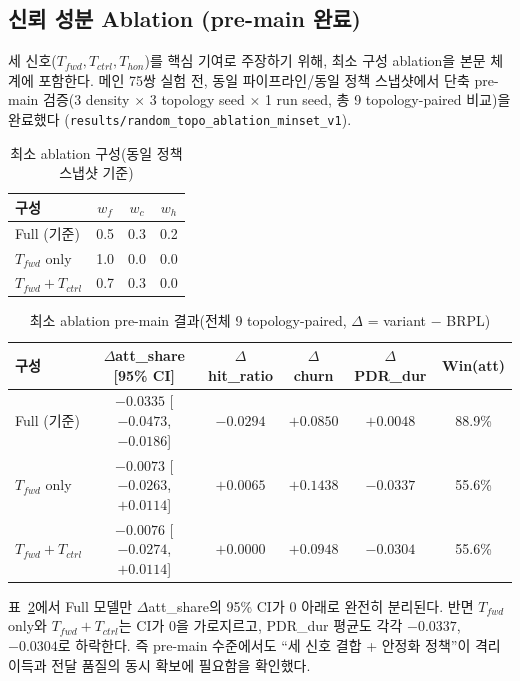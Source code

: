 \documentclass[12pt,a4paper]{article}
\begin{document}
\subsection{신뢰 성분 Ablation (pre-main 완료)}
\label{sec:ablation_plan}

세 신호($T_{fwd},T_{ctrl},T_{hon}$)를 핵심 기여로 주장하기 위해,
최소 구성 ablation을 본문 체계에 포함한다.
메인 75쌍 실험 전, 동일 파이프라인/동일 정책 스냅샷에서
단축 pre-main 검증(3 density $\times$ 3 topology seed $\times$ 1 run seed,
총 9 topology-paired 비교)을 완료했다
(\texttt{results/random\_topo\_ablation\_minset\_v1}).

\begin{table}[t]
\centering
\caption{최소 ablation 구성(동일 정책 스냅샷 기준)}
\label{tab:ablation_minset}
\begin{tabular}{lccc}
\toprule
구성 & $w_f$ & $w_c$ & $w_h$ \\
\midrule
Full (기준) & 0.5 & 0.3 & 0.2 \\
$T_{fwd}$ only & 1.0 & 0.0 & 0.0 \\
$T_{fwd}{+}T_{ctrl}$ & 0.7 & 0.3 & 0.0 \\
\bottomrule
\end{tabular}
\end{table}

\begin{table}[t]
\centering
\caption{최소 ablation pre-main 결과(전체 9 topology-paired, $\Delta$ = variant $-$ BRPL)}
\label{tab:ablation_minset_results}
\begin{tabular}{lccccc}
\toprule
구성 & $\Delta$att\_share [95\% CI] & $\Delta$hit\_ratio & $\Delta$churn & $\Delta$PDR\_dur & Win(att) \\
\midrule
Full (기준) & $-0.0335$ [$-0.0473$, $-0.0186$] & $-0.0294$ & $+0.0850$ & $+0.0048$ & 88.9\% \\
$T_{fwd}$ only & $-0.0073$ [$-0.0263$, $+0.0114$] & $+0.0065$ & $+0.1438$ & $-0.0337$ & 55.6\% \\
$T_{fwd}{+}T_{ctrl}$ & $-0.0076$ [$-0.0274$, $+0.0114$] & $+0.0000$ & $+0.0948$ & $-0.0304$ & 55.6\% \\
\bottomrule
\end{tabular}
\end{table}

표~\ref{tab:ablation_minset_results}에서 Full 모델만
$\Delta$att\_share의 95\% CI가 0 아래로 완전히 분리된다.
반면 $T_{fwd}$ only와 $T_{fwd}{+}T_{ctrl}$는 CI가 0을 가로지르고,
PDR\_dur 평균도 각각 $-0.0337$, $-0.0304$로 하락한다.
즉 pre-main 수준에서도 ``세 신호 결합 + 안정화 정책''이
격리 이득과 전달 품질의 동시 확보에 필요함을 확인했다.
\end{document}
